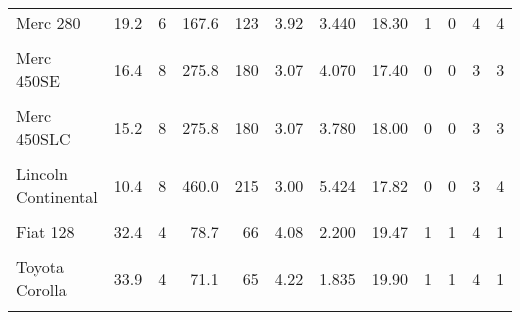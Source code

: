 \documentclass[border=1mm]{standalone}
\begin{document}
\begin{table}
{\begin{tabular}{lrrrrrrrrrrr}
Merc 280 & 19.2 & 6 & 167.6 & 123 & 3.92 & 3.440 & 18.30 & 1 & 0 & 4 & 4\\
\addlinespace
\cellcolor{gray!10}{Merc 280C} & \cellcolor{gray!10}{17.8} & \cellcolor{gray!10}{6} & \cellcolor{gray!10}{167.6} & \cellcolor{gray!10}{123} & \cellcolor{gray!10}{3.92} & \cellcolor{gray!10}{3.440} & \cellcolor{gray!10}{18.90} & \cellcolor{gray!10}{1} & \cellcolor{gray!10}{0} & \cellcolor{gray!10}{4} & \cellcolor{gray!10}{4}\\
Merc 450SE & 16.4 & 8 & 275.8 & 180 & 3.07 & 4.070 & 17.40 & 0 & 0 & 3 & 3\\
\cellcolor{gray!10}{Merc 450SL} & \cellcolor{gray!10}{17.3} & \cellcolor{gray!10}{8} & \cellcolor{gray!10}{275.8} & \cellcolor{gray!10}{180} & \cellcolor{gray!10}{3.07} & \cellcolor{gray!10}{3.730} & \cellcolor{gray!10}{17.60} & \cellcolor{gray!10}{0} & \cellcolor{gray!10}{0} & \cellcolor{gray!10}{3} & \cellcolor{gray!10}{3}\\
Merc 450SLC & 15.2 & 8 & 275.8 & 180 & 3.07 & 3.780 & 18.00 & 0 & 0 & 3 & 3\\
\cellcolor{gray!10}{Cadillac Fleetwood} & \cellcolor{gray!10}{10.4} & \cellcolor{gray!10}{8} & \cellcolor{gray!10}{472.0} & \cellcolor{gray!10}{205} & \cellcolor{gray!10}{2.93} & \cellcolor{gray!10}{5.250} & \cellcolor{gray!10}{17.98} & \cellcolor{gray!10}{0} & \cellcolor{gray!10}{0} & \cellcolor{gray!10}{3} & \cellcolor{gray!10}{4}\\
\addlinespace
Lincoln Continental & 10.4 & 8 & 460.0 & 215 & 3.00 & 5.424 & 17.82 & 0 & 0 & 3 & 4\\
\cellcolor{gray!10}{Chrysler Imperial} & \cellcolor{gray!10}{14.7} & \cellcolor{gray!10}{8} & \cellcolor{gray!10}{440.0} & \cellcolor{gray!10}{230} & \cellcolor{gray!10}{3.23} & \cellcolor{gray!10}{5.345} & \cellcolor{gray!10}{17.42} & \cellcolor{gray!10}{0} & \cellcolor{gray!10}{0} & \cellcolor{gray!10}{3} & \cellcolor{gray!10}{4}\\
Fiat 128 & 32.4 & 4 & 78.7 & 66 & 4.08 & 2.200 & 19.47 & 1 & 1 & 4 & 1\\
\cellcolor{gray!10}{Honda Civic} & \cellcolor{gray!10}{30.4} & \cellcolor{gray!10}{4} & \cellcolor{gray!10}{75.7} & \cellcolor{gray!10}{52} & \cellcolor{gray!10}{4.93} & \cellcolor{gray!10}{1.615} & \cellcolor{gray!10}{18.52} & \cellcolor{gray!10}{1} & \cellcolor{gray!10}{1} & \cellcolor{gray!10}{4} & \cellcolor{gray!10}{2}\\
Toyota Corolla & 33.9 & 4 & 71.1 & 65 & 4.22 & 1.835 & 19.90 & 1 & 1 & 4 & 1\\
\addlinespace

\end{tabular}}
\end{table}
\end{document}
